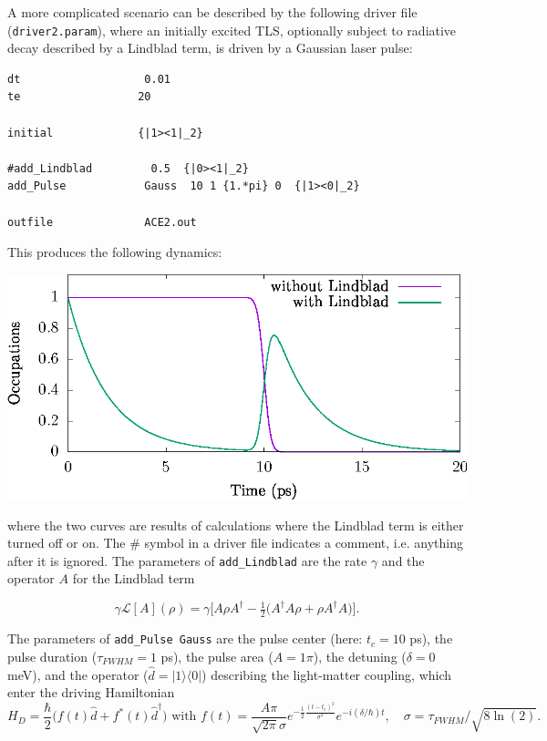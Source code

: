 \documentclass{scrartcl}
\begin{document}
A more complicated scenario can be described by the 
following driver file (\verb+driver2.param+), where an initially excited 
TLS, optionally subject to radiative decay described by a 
Lindblad term, is driven by a Gaussian laser pulse:

\noindent\makebox[5cm]{\rule{7cm}{0.4pt}}
\begin{verbatim}
dt                   0.01
te                  20

initial             {|1><1|_2}

#add_Lindblad         0.5  {|0><1|_2}
add_Pulse            Gauss  10 1 {1.*pi} 0  {|1><0|_2}

outfile              ACE2.out
\end{verbatim}
\noindent\makebox[5cm]{\rule{7cm}{0.4pt}}

This produces the following dynamics:

\includegraphics[width=20cm]{figs/example2.eps}

where the two curves are results of calculations where the Lindblad term is
either turned off or on. The \# symbol in a driver file indicates a comment, 
i.e. anything after it is ignored. The parameters of \texttt{add\_Lindblad}
are the rate $\gamma$ and the operator $A$ for the Lindblad term

\begin{equation}
\gamma \mathcal{L}[A](\rho)=\gamma\bigg[ A\rho A^\dagger 
-\tfrac 12\big(A^\dagger A\rho +\rho A^\dagger A \big)\bigg].
\end{equation}

The parameters of \verb+add_Pulse Gauss+ are the pulse center
(here: $t_c=10$ ps),
the pulse duration ($\tau_{FWHM}=1$ ps), the pulse area ($A=1 \pi$), the
detuning ($\delta=0$ meV), and the operator ($\hat{d}=|1\rangle\langle 0|$)
describing the light-matter coupling, which enter the driving Hamiltonian
\begin{equation}
H_D=\frac{\hbar}{2} \big(f(t) \hat{d} + f^*(t) \hat{d}^\dagger\big) 
\textrm{ with }
f(t)=\frac{A \pi}{\sqrt{2\pi}\sigma} e^{-\frac 12 \frac{(t-t_c)^2}{\sigma^2}}
e^{-i (\delta/\hbar) t},
\quad \sigma=\tau_{FWHM}/\sqrt{8 \ln(2)}.
\end{equation}
\end{document}

